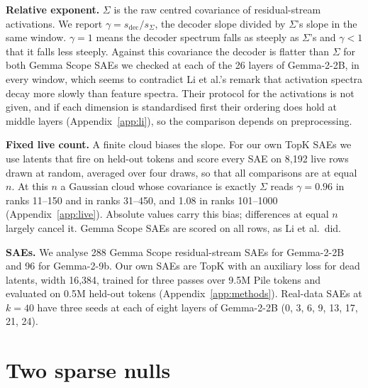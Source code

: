 \documentclass{article}
\newcommand{\Sig}{\Sigma}
\begin{document}
\textbf{Relative exponent.} $\Sig$ is the raw centred covariance of residual-stream activations. We report $\gamma = s_{\mathrm{dec}}/s_{\Sig}$, the decoder slope divided by $\Sig$'s slope in the same window. $\gamma=1$ means the decoder spectrum falls as steeply as $\Sig$'s and $\gamma<1$ that it falls less steeply. Against this covariance the decoder is flatter than $\Sig$ for both Gemma Scope SAEs we checked at each of the 26 layers of Gemma-2-2B, in every window, which seems to contradict Li et al.'s remark that activation spectra decay more slowly than feature spectra. Their protocol for the activations is not given, and if each dimension is standardised first their ordering does hold at middle layers (Appendix~\ref{app:li}), so the comparison depends on preprocessing.

\textbf{Fixed live count.} A finite cloud biases the slope. For our own TopK SAEs we use latents that fire on held-out tokens and score every SAE on 8,192 live rows drawn at random, averaged over four draws, so that all comparisons are at equal $n$. At this $n$ a Gaussian cloud whose covariance is exactly $\Sig$ reads $\gamma = 0.96$ in ranks 11--150 and in ranks 31--450, and 1.08 in ranks 101--1000 (Appendix~\ref{app:live}). Absolute values carry this bias; differences at equal $n$ largely cancel it. Gemma Scope SAEs are scored on all rows, as Li et al.\ did.

\textbf{SAEs.} We analyse 288 Gemma Scope residual-stream SAEs for Gemma-2-2B and 96 for Gemma-2-9b. Our own SAEs are TopK with an auxiliary loss for dead latents, width 16,384, trained for three passes over 9.5M Pile tokens and evaluated on 0.5M held-out tokens (Appendix~\ref{app:methods}). Real-data SAEs at $k=40$ have three seeds at each of eight layers of Gemma-2-2B (0, 3, 6, 9, 13, 17, 21, 24).

\section{Two sparse nulls}
\label{sec:nulls}
\end{document}
